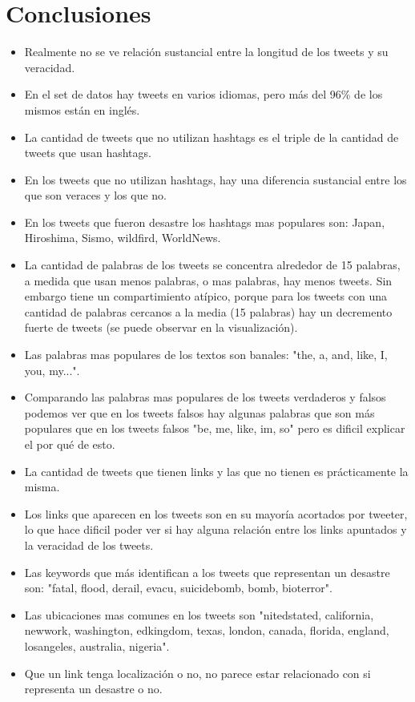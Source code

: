 \documentclass[titlepage,a4paper]{article}
\begin{document}
\section{\Large Conclusiones}
\begin{itemize}
  \item Realmente no se ve relación sustancial entre la longitud de los tweets y su veracidad.
  \item En el set de datos hay tweets en varios idiomas, pero más del 96\% de los mismos están en inglés.
  \item La cantidad de tweets que no utilizan hashtags es el triple de la cantidad de tweets que usan hashtags. 
  \item En los tweets que no utilizan hashtags, hay una diferencia sustancial entre los que son veraces y los que no.
  \item En los tweets que fueron desastre los hashtags mas populares son: Japan, Hiroshima, Sismo, wildfird, WorldNews.
  \item La cantidad de palabras de los tweets se concentra alrededor de 15 palabras, a medida que usan menos palabras, o mas palabras, hay menos tweets. Sin embargo tiene un compartimiento atípico, porque para los tweets con una cantidad de palabras cercanos a la media (15 palabras) hay un decremento fuerte de tweets (se puede observar en la visualización). 
  \item Las palabras mas populares de los textos son banales: "the, a, and, like, I, you, my...".
  \item Comparando las palabras mas populares de los tweets verdaderos y falsos podemos ver que en los tweets falsos hay algunas palabras que son más populares que en los tweets falsos "be, me, like, im, so" pero es dificil explicar el por qué de esto.
  \item La cantidad de tweets que tienen links y las que no tienen es prácticamente la misma.
  \item Los links que aparecen en los tweets son en su mayoría acortados por tweeter, lo que hace dificil poder ver si hay alguna relación entre los links apuntados y la veracidad de los tweets.
  \item Las keywords que más identifican a los tweets que representan un desastre son: "fatal, flood, derail, evacu, suicidebomb, bomb, bioterror".
  \item Las ubicaciones mas comunes en los tweets son "nitedstated, california, newwork, washington, edkingdom, texas, london, canada, florida, england, losangeles, australia, nigeria".
  \item Que un link tenga localización o no, no parece estar relacionado con si representa un desastre o no.
\end{itemize}
\end{document}
